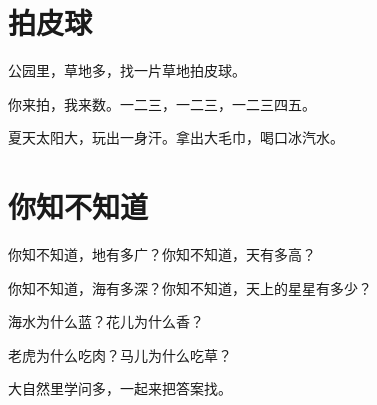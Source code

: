 \documentclass[12pt,UTF-8,openany]{ctexbook}
\begin{document}
\hanzibox{}\hanzibox{}\hanzibox{}\hanzibox{}\hspace{1em}\hanzibox{}\hanzibox{}\hanzibox{}\hanzibox{}






\chapter{拍皮球}

\begin{large}
    
    公园里，草地多，找一片草地拍皮球。
    
    你来拍，我来数。一二三，一二三，一二三四五。
    
    夏天太阳大，玩出一身汗。拿出大毛巾，喝口冰汽水。
    
\end{large}


\clearpage

\begin{center}
    
    
    
\end{center}


\hanzibox{}\hanzibox{}\hanzibox{}\hanzibox{}\hspace{1em}\hanzibox{}\hanzibox{}\hanzibox{}\hanzibox{}

\hanzibox{}\hanzibox{}\hanzibox{}\hanzibox{}\hspace{1em}\hanzibox{}\hanzibox{}\hanzibox{}\hanzibox{}

\hanzibox{}\hanzibox{}\hanzibox{}\hanzibox{}\hspace{1em}\hanzibox{}\hanzibox{}\hanzibox{}\hanzibox{}

\hanzibox{}\hanzibox{}\hanzibox{}\hanzibox{}\hspace{1em}\hanzibox{}\hanzibox{}\hanzibox{}\hanzibox{}






\chapter{你知不知道}

\begin{large}
    
    你知不知道，地有多广？你知不知道，天有多高？
    
    你知不知道，海有多深？你知不知道，天上的星星有多少？
    
    海水为什么蓝？花儿为什么香？
    
    老虎为什么吃肉？马儿为什么吃草？
    
    大自然里学问多，一起来把答案找。
    
\end{large}
\end{document}
